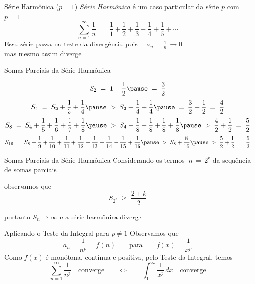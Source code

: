 \begin{frame}{Série Harmônica ($p=1$)}
  \emph{Série Harmônica} é um caso particular da série $p$ com $p=1$
  \[ \sum_{n=1}^{\infty} \frac{1}{n} \;=\;
     \frac{1}{1} +
     \frac{1}{2} +
     \frac{1}{3} +
     \frac{1}{4} +
     \frac{1}{5} + \cdots
  \]
  \pause
  Essa série passa no teste da divergência pois \(\quad a_n = \frac{1}{\,n\,}\to 0\) \\[3mm]
  mas mesmo assim diverge
\end{frame}

\begin{frame}{Somas Parciais da Série Harmônica}

	{\color<3->{gray}
	\[
			S_2 \;=\; 1 + \frac{1}{2} \pause \;=\; \frac{3}{2}
	\]}
	\pause
	{\color<6->{gray}
	\[
		S_4 \;=\; S_2 + \frac{1}{3} + \frac{1}{4} \pause
	      \;>\; S_2 + \frac{1}{4} + \frac{1}{4} \pause
	      \;=\; \frac{3}{2} + \frac{1}{2}
	      \;=\; \frac{4}{2}
	\]}
	\pause
	{\color<9->{gray}
	\[ S_8 \;=\; S_4 + \frac{1}{5} + \frac{1}{6} + \frac{1}{7} + \frac{1}{8} \pause
	       \;>\; S_4 + \frac{1}{8} + \frac{1}{8} + \frac{1}{8} + \frac{1}{8} \pause
	       \;>\; \frac{4}{2} + \frac{1}{2}
	       \;=\; \frac{5}{2}
	\]}
	\pause
	\[ S_{16} \;=\; S_8 + \frac{1}{9}  + \frac{1}{10} + \frac{1}{11}
	                    + \frac{1}{12} + \frac{1}{13} + \frac{1}{14}
	                    + \frac{1}{15} + \frac{1}{16} \pause
	          \;>\; S_8 + \frac{8}{16} \pause
	          \;>\; \frac{5}{2} + \frac{1}{2}
	          \;=\; \frac{6}{2}
	\]
\end{frame}

\begin{frame}{Somas Parciais da Série Harmônica}
  Considerando os termos $\;n\,=\,2^k$ da sequência de somas parciais

  observamos que
  \[  S_{2^k} \;\geq\; \frac{2+k}{2}\]

  portanto $S_n\to\infty$ e a série harmônica diverge
\end{frame}

\begin{frame}{Aplicando o Teste da Integral para $p\neq 1$}
  Observamos que
  \[
  	a_n = \frac{1}{n^p} = f(n) \qquad \text{para} \qquad f(x) = \frac{1}{x^p}
  \]
  \pause
  Como $f(x)$ é monótona, contínua e positiva, pelo Teste da Integral, temos
  \[
    \sum_{n=1}^{\infty} \frac{1}{n^p} \quad\text{converge}
    \qquad\Leftrightarrow\qquad
    \int_{1}^{\infty} \frac{1}{x^p}\,dx \quad\text{converge}
  \]
\end{frame}

